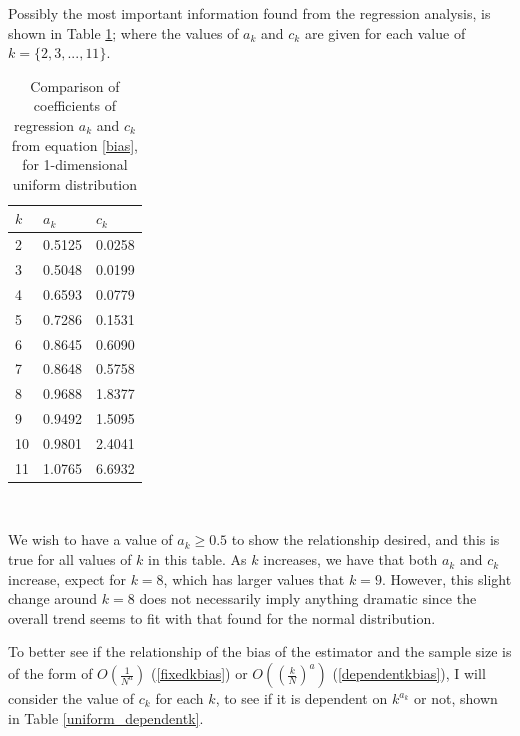 \documentclass[12pt]{report}
\begin{document}
Possibly the most important information found from the regression analysis, is shown in Table \ref{uniform_a_c_compare_table}; where the values of $a_{k}$ and $c_{k}$ are given for each value of $k = \{ 2, 3, ..., 11\}$.

\begin{table}
\caption{Comparison of coefficients of regression $a_{k}$ and $c_{k}$ from equation \ref{bias}, for 1-dimensional uniform distribution} \label{uniform_a_c_compare_table}
\begin{center}
\begin{tabular}{| l | l l |} 
\toprule
$k$ &  $a_{k}$ & $c_{k}$ \\
\midrule[1pt]
2     & 0.5125    & 0.0258   \\
3     & 0.5048    & 0.0199   \\
4     & 0.6593    & 0.0779   \\
5     & 0.7286    & 0.1531   \\
6     & 0.8645    & 0.6090   \\
7     & 0.8648    & 0.5758   \\
8     & 0.9688    & 1.8377   \\
9     & 0.9492    & 1.5095   \\
10    & 0.9801    & 2.4041   \\
11    & 1.0765    & 6.6932   \\
\hline
\end{tabular}
\\[10pt]
\end{center}
\end{table}

We wish to have a value of $a_{k} \geq 0.5$ to show the relationship desired, and this is true for all values of $k$ in this table. As $k$ increases, we have that both $a_{k}$ and $c_{k}$ increase, expect for $k=8$, which has larger values that $k=9$. However, this slight change around $k=8$ does not necessarily imply anything dramatic since the overall trend seems to fit with that found for the normal distribution.

To better see if the relationship of the bias of the estimator and the sample size is of the form of $O \left( \frac{1}{N^{a}} \right)$ (\ref{fixedkbias}) or $O\left( \left( \frac{k}{N} \right)^{a} \right)$ (\ref{dependentkbias}), I will consider the value of $c_{k}$ for each $k$, to see if it is dependent on $k^{a_{k}}$ or not, shown in Table \ref{uniform_dependentk}.
\end{document}
